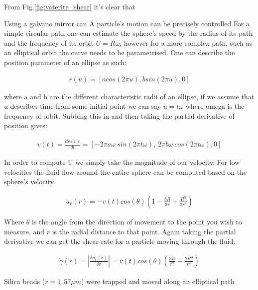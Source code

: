 \documentclass[a4paper,oneside,11pt]{book}
\begin{document}
From Fig.\ref{fig:vaterite_shear} it's clear that 

Using a galvano mirror can A particle's motion can be precisely controlled For a simple circular path one can estimate the sphere's speed by the radius of its path and the frequency of its orbit $U = R\omega$; however for a more complex path, such as an elliptical orbit the curve needs to be parametrised. One can describe the position parameter of an ellipse as such:

\begin{align}
	r(u) = \left[acos(2\pi u),bsin(2\pi u), 0 \right]
\end{align}

where a and b are the different characteristic radii of an ellipse, if we assume that u describes time from some initial point we can say $u=t\omega$ where omega is the frequency of orbit. Subbing this in and then taking the partial derivative of position gives:

\begin{align}
	v(t) = \frac{dr(t)}{dt} = \left[-2\pi a\omega \ sin(2\pi t\omega),\ 2\pi b\omega \ cos(2\pi t\omega),0 \right]
\end{align}

In order to compute U we simply take the magnitude of our velocity. For low velocities the fluid flow around the entire sphere can be computed based on the sphere's velocity.

\begin{align}
	u_r(r)=-v(t)cos(\theta)\left(1-\frac{3R}{2r}+\frac{R^3}{2r^3}\right)
\end{align}

Where $\theta$ is the angle from the direction of movement to the point you wish to measure, and $r$ is the radial distance to that point. Again taking the partial derivative we can get the shear rate for a particle moving through the fluid:

\begin{align}
	\dot{\gamma}(r) = \left| \frac{\delta u_r(r)}{\delta r}\right| = v(t)cos(\theta)\left(\frac{3R}{r^2} -\frac{2R^3}{r^4} \right)
\end{align}

Silica beads ($r=1,57 \mu m$) were trapped and moved along an elliptical path



\end{document}
